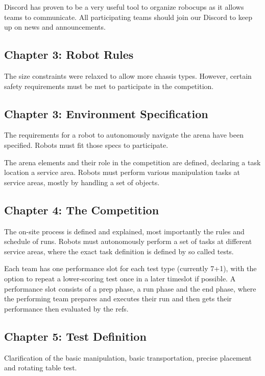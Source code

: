 Discord has proven to be a very useful tool to organize 
robocups as it allows teams to communicate. All participating teams should join our Discord to keep up on news and announcements.

\subsection{Chapter 3: Robot Rules}

The size constraints were relaxed to allow more chassis types.
However, certain safety requirements must be met to participate in the competition.

\subsection{Chapter 3: Environment Specification}

The requirements for a robot to autonomously navigate the arena have been specified. Robots must fit those specs to participate.

The arena elements and their role in the competition are defined, declaring a task location a service area.
Robots must perform various manipulation tasks at service areas, mostly by handling a set of objects.



\subsection{Chapter 4: The Competition}

The on-site process is defined and explained, most importantly the rules and schedule of runs. Robots must autonomously perform a set of tasks at different service areas, where the exact task definition is defined by so called tests.

Each team has one performance slot for each test type (currently 7+1), with the option to repeat a lower-scoring test once in a later timeslot if possible.
A performance slot consists of a prep phase, a run phase and the end phase, where the performing team prepares and executes their run and then gets their performance then evaluated by the refs.

\subsection{Chapter 5: Test Definition}

Clarification of the basic manipulation, basic transportation, precise placement and rotating table test.


